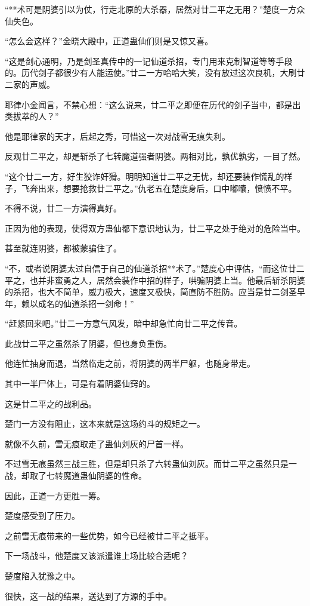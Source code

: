 \begin{this_body}
“**术可是阴婆引以为仗，行走北原的大杀器，居然对廿二平之无用？”楚度一方众仙失色。

“怎么会这样？”金晓大殿中，正道蛊仙们则是又惊又喜。

“这是剑心通明，乃是剑圣真传中的一记仙道杀招，专门用来克制智道等等手段的。历代剑子都很少有人能运使。”廿二一方哈哈大笑，没有放过这次良机，大刷廿二家的声威。

耶律小金闻言，不禁心想：“这么说来，廿二平之即便在历代的剑子当中，都是出类拔萃的人？”

他是耶律家的天才，后起之秀，可惜这一次对战雪无痕失利。

反观廿二平之，却是斩杀了七转魔道强者阴婆。两相对比，孰优孰劣，一目了然。

“这个廿二一方，好生狡诈奸猾。明明知道廿二平之无忧，却还要装作慌乱的样子，飞奔出来，想要抢救廿二平之。”仇老五在楚度身后，口中嘟囔，愤愤不平。

不得不说，廿二一方演得真好。

正因为他的表现，使得双方蛊仙都下意识地认为，廿二平之处于绝对的危险当中。

甚至就连阴婆，都被蒙骗住了。

“不，或者说阴婆太过自信于自己的仙道杀招**术了。”楚度心中评估，“而这位廿二平之，也并非蛮勇之人，居然会装作中招的样子，哄骗阴婆上当。他最后斩杀阴婆的杀招，也大不简单，威力极大，速度又极快，简直防不胜防。应当是廿二剑圣早年，赖以成名的仙道杀招一剑命！”

“赶紧回来吧。”廿二一方意气风发，暗中却急忙向廿二平之传音。

此战廿二平之虽然杀了阴婆，但也身负重伤。

他连忙抽身而退，当然临走之前，将阴婆的两半尸躯，也随身带走。

其中一半尸体上，可是有着阴婆仙窍的。

这是廿二平之的战利品。

楚门一方没有阻止，这本来就是这场约斗的规矩之一。

就像不久前，雪无痕取走了蛊仙刘灰的尸首一样。

不过雪无痕虽然三战三胜，但是却只杀了六转蛊仙刘灰。而廿二平之虽然只是一战，却取了七转魔道蛊仙阴婆的性命。

因此，正道一方更胜一筹。

楚度感受到了压力。

之前雪无痕带来的一些优势，如今已经被廿二平之抵平。

下一场战斗，他楚度又该派遣谁上场比较合适呢？

楚度陷入犹豫之中。

很快，这一战的结果，送达到了方源的手中。


\end{this_body}
